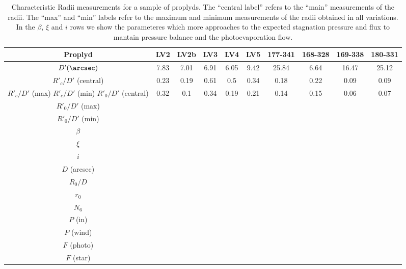  \begin{table*}
\begin{tabular}{c|ccccccccc}\hline
Proplyd & LV2 & LV2b & LV3 & LV4  & LV5 & 177-341 & 168-328 & 169-338 & 180-331\\\hline
$D' (\arcsec)$ &7.83 & 7.01 &6.91 & 6.05 & 9.42 & 25.84 & 6.64 & 16.47 & 25.12 \\
$R'_c/D'$ (central)  & 0.23  & 0.19& 0.61  & 0.5  & 0.34  & 0.18  & 0.22 & 0.09 & 0.09\\
$R'_c/D'$ (max)
$R'_c/D'$ (min)
$R'_0/D'$ (central) & 0.32 & 0.1 & 0.34 & 0.19 & 0.21 & 0.14 & 0.15 & 0.06 & 0.07\\
$R'_0/D'$ (max)&&&&&&&&& \\
$R'_0/D'$ (min)&&&&&&&&& \\
$\beta$ &&&&&&&&& \\
$\xi$ &&&&&&&&& \\
$i$ &&&&&&&&& \\
$D$ (arcsec) &&&&&&&&& \\
$R_0/D$ &&&&&&&&& \\
$r_0$ &&&&&&&&& \\
$N_6$ &&&&&&&&& \\
$P$ (in) &&&&&&&&& \\
$P$ (wind) &&&&&&&&& \\
$F$ (photo) &&&&&&&&& \\
$F$ (star)  &&&&&&&&& \\
\end{tabular}
\caption{Characteristic Radii measurements for a sample of proplyds. The ``central label'' refers to the ``main'' 
measurements of the radii. The ``max'' and ``min'' labels refer to the maximum and minimum measurements of the radii
obtained in all variations. In the $\beta$, $\xi$ and $i$ rows we show the parameteres which more approaches to the 
expected stagnation pressure and flux to mantain pressure balance and the photoevaporation flow.
} 

\label{tab:proplyds}
\end{table*}

